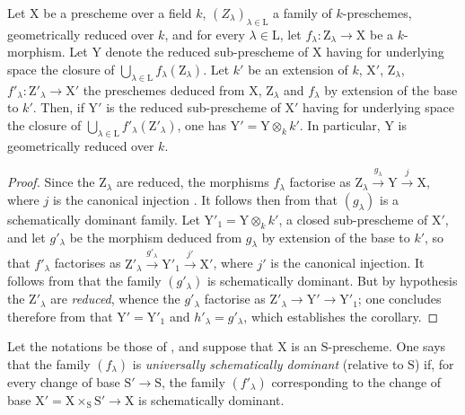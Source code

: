 \begin{corollary}[11.10.7]
\label{IV.11.10.7}
Let $\mathrm{X}$ be a prescheme over a field $k$, $(Z_\lambda)_{\lambda\in\mathrm{L}}$ a family of $k$-preschemes, geometrically reduced over $k$, and for every $\lambda\in\mathrm{L}$, let $f_\lambda:\mathrm{Z}_\lambda\to\mathrm{X}$ be a $k$-morphism.
Let $\mathrm{Y}$ denote the reduced sub-prescheme of $\mathrm{X}$ having for underlying space the closure of $\bigcup_{\lambda\in\mathrm{L}}f_\lambda(\mathrm{Z}_\lambda)$.
Let $k'$ be an extension of $k$, $\mathrm{X}'$, $\mathrm{Z}_\lambda$, $f'_\lambda:\mathrm{Z}'_\lambda\to\mathrm{X}'$ the preschemes deduced from $\mathrm{X}$, $\mathrm{Z}_\lambda$ and $f_\lambda$ by extension of the base to $k'$.
Then, if $\mathrm{Y}'$ is the reduced sub-prescheme of $\mathrm{X}'$ having for underlying space the closure of $\bigcup_{\lambda\in\mathrm{L}}f'_\lambda(\mathrm{Z}'_\lambda)$, one has $\mathrm{Y}'=\mathrm{Y}\otimes_k k'$.
In particular, $\mathrm{Y}$ is geometrically reduced over $k$.
\end{corollary}

\begin{proof}
Since the $\mathrm{Z}_\lambda$ are reduced, the morphisms $f_\lambda$ factorise as $\mathrm{Z}_\lambda\xrightarrow{g_\lambda}\mathrm{Y}\xrightarrow{j}\mathrm{X}$, where $j$ is the canonical injection .
It follows then from  that $(g_\lambda)$ is a schematically dominant family.
Let $\mathrm{Y}'_1=\mathrm{Y}\otimes_k k'$, a closed sub-prescheme of $\mathrm{X}'$, and let $g'_\lambda$ be the morphism deduced from $g_\lambda$ by extension of the base to $k'$, so that $f'_\lambda$ factorises as $\mathrm{Z}'_\lambda\xrightarrow{g'_\lambda}\mathrm{Y}'_1\xrightarrow{j'}\mathrm{X}'$, where $j'$ is the canonical injection.
It follows from  that the family $(g'_\lambda)$ is schematically dominant.
But by hypothesis the $\mathrm{Z}'_\lambda$ are \emph{reduced}, whence  the $g'_\lambda$ factorise as $\mathrm{Z}'_\lambda\to\mathrm{Y}'\to\mathrm{Y}'_1$; one concludes therefore from  that $\mathrm{Y}'=\mathrm{Y}'_1$ and $h'_\lambda=g'_\lambda$, which establishes the corollary.
\end{proof}

\begin{definition}[11.10.8]
\label{IV.11.10.8}
Let the notations be those of , and suppose that $\mathrm{X}$ is an $\mathrm{S}$-prescheme.
One says that the family $(f_\lambda)$ is \emph{universally schematically dominant} (relative to $\mathrm{S}$) if, for every change of base $\mathrm{S}'\to\mathrm{S}$, the family $(f'_\lambda)$ corresponding to the change of base $\mathrm{X}'=\mathrm{X}\times_\mathrm{S}\mathrm{S}'\to\mathrm{X}$ is schematically dominant.
\end{definition}

